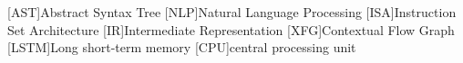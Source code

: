 \begin{acronym}
[AST]{Abstract Syntax Tree}
[NLP]{Natural Language Processing}
[ISA]{Instruction Set Architecture}
[IR]{Intermediate Representation}
[XFG]{Contextual Flow Graph}
[LSTM]{Long short-term memory}
[CPU]{central processing unit}
\end{acronym}